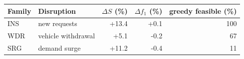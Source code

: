 \begin{tabular}{llrrr}
\toprule
\textbf{Family} & \textbf{Disruption} & $\Delta S$ (\%) & $\Delta f_1$ (\%) & greedy feasible (\%) \\
\midrule
\textsf{INS} & new requests & +13.4 & +0.1 & 100 \\
\textsf{WDR} & vehicle withdrawal & +5.1 & -0.2 & 67 \\
\textsf{SRG} & demand surge & +11.2 & -0.4 & 11 \\
\bottomrule
\end{tabular}
